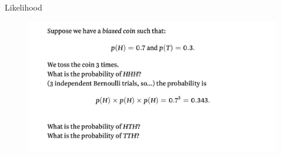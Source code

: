 \documentclass{beamer}
\begin{document}
\begin{frame}{Likelihood}

        \begin{figure}
                \includegraphics[width=\linewidth]{like1.png}
        \end{figure}

\end{frame}
\end{document}
